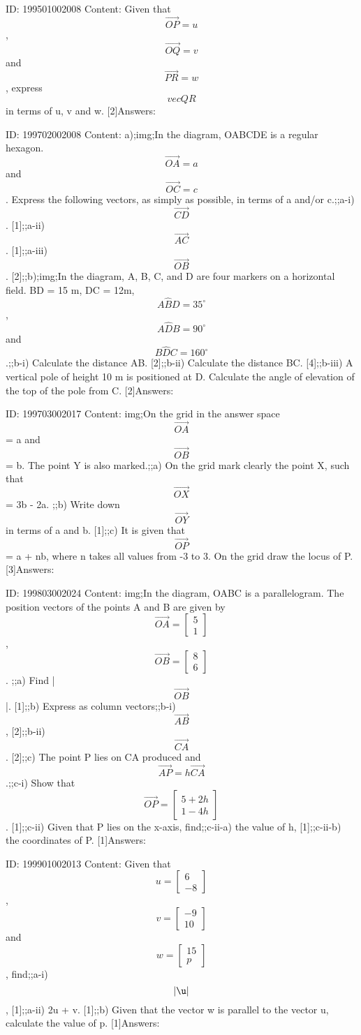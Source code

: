 \documentclass{article}
\begin{document}
ID: 199501002008
Content:
Given that $$\vec{OP} = u$$, $$\vec{OQ} = v$$ and $$\vec{PR} = w$$, express $$vec{QR}$$ in terms of u, v and w. [2]Answers:

ID: 199702002008
Content:
a);img;In the diagram, OABCDE is a regular hexagon. $$\vec{OA}=a$$ and $$\vec{OC}=c$$. Express the following vectors, as simply as possible, in terms of a and/or c.;;a-i) $$\vec{CD}$$. [1];;a-ii) $$\vec{AC}$$. [1];;a-iii) $$\vec{OB}$$. [2];;b);img;In the diagram, A, B, C, and D are four markers on a horizontal field. BD = 15 m, DC = 12m, $$A \hat BD=35^{\circ}$$, $$A \hat DB=90^{\circ}$$ and $$B \hat DC=160^{\circ}$$.;;b-i) Calculate the distance AB. [2];;b-ii) Calculate the distance BC. [4];;b-iii) A vertical pole of height 10 m is positioned at D. Calculate the angle of elevation of the top of the pole from C. [2]Answers:

ID: 199703002017
Content:
img;On the grid in the answer space $$\vec{OA}$$ = a and $$\vec{OB}$$ = b. The point Y is also marked.;;a) On the grid mark clearly the point X, such that $$\vec{OX}$$ = 3b - 2a. ;;b) Write down $$\vec{OY}$$ in terms of a and b. [1];;c) It is given that $$\vec{OP}$$ = a + nb, where n takes all values from -3 to 3. On the grid draw the locus of P. [3]Answers:

ID: 199803002024
Content:
img;In the diagram, OABC is a parallelogram. The position vectors of the points A and B are given by $$\vec{OA} = \begin{bmatrix}5\\1\end{bmatrix}$$, $$\vec{OB} = \begin{bmatrix}8\\6\end{bmatrix}$$. ;;a) Find |$$\vec{OB}$$|. [1];;b) Express as column vectors;;b-i) $$\vec{AB}$$, [2];;b-ii) $$\vec{CA}$$. [2];;c) The point P lies on CA produced and $$\vec{AP} = h \vec{CA}$$.;;c-i) Show that $$\vec{OP} = \begin{bmatrix}5+2h\\1-4h\end{bmatrix}$$. [1];;c-ii) Given that P lies on the x-axis, find;;c-ii-a) the value of h, [1];;c-ii-b) the coordinates of P. [1]Answers:

ID: 199901002013
Content:
Given that $$u=\begin{bmatrix}6\\-8\end{bmatrix}$$, $$v=\begin{bmatrix}-9\\10\end{bmatrix}$$ and $$w=\begin{bmatrix}15\\p\end{bmatrix}$$, find;;a-i) $$|\u|$$, [1];;a-ii) 2u + v. [1];;b) Given that the vector w is parallel to the vector  u, calculate the value of p. [1]Answers:
\end{document}
